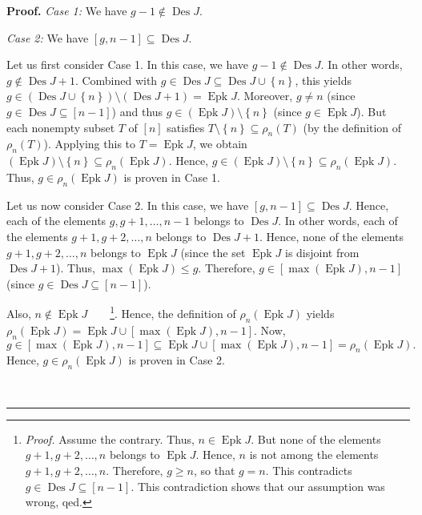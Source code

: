 \documentclass[numbers=enddot,12pt,final,onecolumn,notitlepage]{scrartcl}%
\theoremstyle{definition}
\newenvironment{proof}[1][Proof]{\noindent\textbf{#1.} }{\ \rule{0.5em}{0.5em}}
\begin{document}
\begin{proof}
\textit{Case 1:} We have $g-1\notin\operatorname*{Des}J$.

\textit{Case 2:} We have $\left[  g,n-1\right]  \subseteq\operatorname*{Des}J$.

Let us first consider Case 1. In this case, we have $g-1\notin%
\operatorname*{Des}J$. In other words, $g\notin\operatorname*{Des}J+1$.
Combined with $g\in\operatorname*{Des}J\subseteq\operatorname*{Des}%
J\cup\left\{  n\right\}  $, this yields $g\in\left(  \operatorname*{Des}%
J\cup\left\{  n\right\}  \right)  \setminus\left(  \operatorname*{Des}%
J+1\right)  =\operatorname*{Epk}J$. Moreover, $g\neq n$ (since $g\in
\operatorname*{Des}J\subseteq\left[  n-1\right]  $) and thus $g\in\left(
\operatorname*{Epk}J\right)  \setminus\left\{  n\right\}  $ (since
$g\in\operatorname*{Epk}J$). But each nonempty subset $T$ of $\left[
n\right]  $ satisfies $T\setminus\left\{  n\right\}  \subseteq\rho_{n}\left(
T\right)  $ (by the definition of $\rho_{n}\left(  T\right)  $). Applying this
to $T=\operatorname*{Epk}J$, we obtain $\left(  \operatorname*{Epk}J\right)
\setminus\left\{  n\right\}  \subseteq\rho_{n}\left(  \operatorname*{Epk}%
J\right)  $. Hence, $g\in\left(  \operatorname*{Epk}J\right)  \setminus
\left\{  n\right\}  \subseteq\rho_{n}\left(  \operatorname*{Epk}J\right)  $.
Thus, $g\in\rho_{n}\left(  \operatorname*{Epk}J\right)  $ is proven in Case 1.

Let us now consider Case 2. In this case, we have $\left[  g,n-1\right]
\subseteq\operatorname*{Des}J$. Hence, each of the elements $g,g+1,\ldots,n-1$
belongs to $\operatorname*{Des}J$. In other words, each of the elements
$g+1,g+2,\ldots,n$ belongs to $\operatorname*{Des}J+1$. Hence, none of the
elements $g+1,g+2,\ldots,n$ belongs to $\operatorname*{Epk}J$ (since the set
$\operatorname*{Epk}J$ is disjoint from $\operatorname*{Des}J+1$). Thus,
$\max\left(  \operatorname*{Epk}J\right)  \leq g$. Therefore, $g\in\left[
\max\left(  \operatorname*{Epk}J\right)  ,n-1\right]  $ (since $g\in
\operatorname*{Des}J\subseteq\left[  n-1\right]  $).

Also, $n\notin\operatorname*{Epk}J$\ \ \ \ \footnote{\textit{Proof.} Assume
the contrary. Thus, $n\in\operatorname*{Epk}J$. But none of the elements
$g+1,g+2,\ldots,n$ belongs to $\operatorname*{Epk}J$. Hence, $n$ is not among
the elements $g+1,g+2,\ldots,n$. Therefore, $g\geq n$, so that $g=n$. This
contradicts $g\in\operatorname*{Des}J\subseteq\left[  n-1\right]  $. This
contradiction shows that our assumption was wrong, qed.}. Hence, the
definition of $\rho_{n}\left(  \operatorname*{Epk}J\right)  $ yields $\rho
_{n}\left(  \operatorname*{Epk}J\right)  =\operatorname*{Epk}J\cup\left[
\max\left(  \operatorname*{Epk}J\right)  ,n-1\right]  $. Now,%
\[
g\in\left[  \max\left(  \operatorname*{Epk}J\right)  ,n-1\right]
\subseteq\operatorname*{Epk}J\cup\left[  \max\left(  \operatorname*{Epk}%
J\right)  ,n-1\right]  =\rho_{n}\left(  \operatorname*{Epk}J\right)  .
\]
Hence, $g\in\rho_{n}\left(  \operatorname*{Epk}J\right)  $ is proven in Case 2.


\end{proof}
\end{document}
